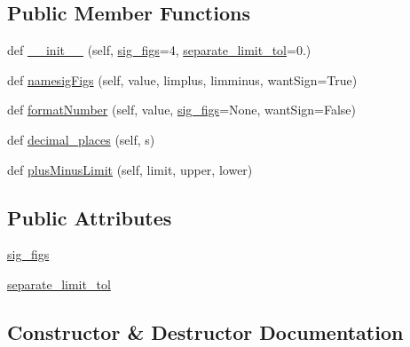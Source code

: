 \subsection*{Public Member Functions}
\begin{DoxyCompactItemize}
\item 
def \mbox{\hyperlink{classgetdist_1_1types_1_1NumberFormatter_a4435fad653dad699e5033bf16d4a98fa}{\+\_\+\+\_\+init\+\_\+\+\_\+}} (self, \mbox{\hyperlink{classgetdist_1_1types_1_1NumberFormatter_a33a4a2a590cd4940208a5195e13ef6b2}{sig\+\_\+figs}}=4, \mbox{\hyperlink{classgetdist_1_1types_1_1NumberFormatter_adcfc154de32afddda5f3e3096691ba65}{separate\+\_\+limit\+\_\+tol}}=0.)
\item 
def \mbox{\hyperlink{classgetdist_1_1types_1_1NumberFormatter_a8155a1cfc8dfb1430639147398d6e444}{namesig\+Figs}} (self, value, limplus, limminus, want\+Sign=True)
\item 
def \mbox{\hyperlink{classgetdist_1_1types_1_1NumberFormatter_a17323aa6fd485dcfe1c120fe7db58243}{format\+Number}} (self, value, \mbox{\hyperlink{classgetdist_1_1types_1_1NumberFormatter_a33a4a2a590cd4940208a5195e13ef6b2}{sig\+\_\+figs}}=None, want\+Sign=False)
\item 
def \mbox{\hyperlink{classgetdist_1_1types_1_1NumberFormatter_a533ae9cd31215f7aef04852ff06b1dcf}{decimal\+\_\+places}} (self, s)
\item 
def \mbox{\hyperlink{classgetdist_1_1types_1_1NumberFormatter_adaac15103cbb1c4df06f083555f8d2aa}{plus\+Minus\+Limit}} (self, limit, upper, lower)
\end{DoxyCompactItemize}
\subsection*{Public Attributes}
\begin{DoxyCompactItemize}
\item 
\mbox{\hyperlink{classgetdist_1_1types_1_1NumberFormatter_a33a4a2a590cd4940208a5195e13ef6b2}{sig\+\_\+figs}}
\item 
\mbox{\hyperlink{classgetdist_1_1types_1_1NumberFormatter_adcfc154de32afddda5f3e3096691ba65}{separate\+\_\+limit\+\_\+tol}}
\end{DoxyCompactItemize}


\subsection{Constructor \& Destructor Documentation}
\mbox{\label{classgetdist_1_1types_1_1NumberFormatter_a4435fad653dad699e5033bf16d4a98fa}} 
